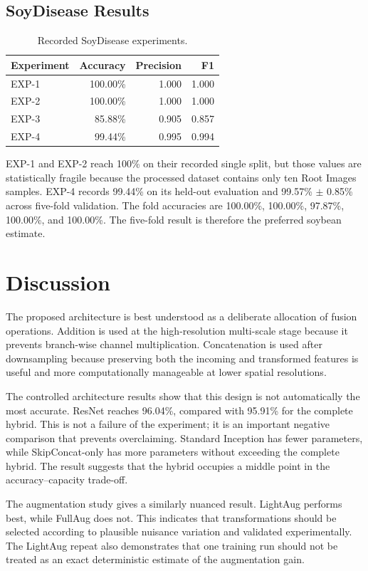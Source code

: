 \documentclass[a4paper,fleqn]{cas-dc}
\begin{document}
\subsection{SoyDisease Results}
\begin{table}[!t]
\centering
\caption{Recorded SoyDisease experiments.}
\label{tab:soy}
\begin{tabular}{lrrr}
\toprule
Experiment & Accuracy & Precision & F1 \\
\midrule
EXP-1 & 100.00\% & 1.000 & 1.000 \\
EXP-2 & 100.00\% & 1.000 & 1.000 \\
EXP-3 & 85.88\% & 0.905 & 0.857 \\
EXP-4 & 99.44\% & 0.995 & 0.994 \\
\bottomrule
\end{tabular}
\end{table}

EXP-1 and EXP-2 reach 100\% on their recorded single split, but those values are statistically fragile because the processed dataset contains only ten Root Images samples. EXP-4 records 99.44\% on its held-out evaluation and 99.57\% $\pm$ 0.85\% across five-fold validation. The fold accuracies are 100.00\%, 100.00\%, 97.87\%, 100.00\%, and 100.00\%. The five-fold result is therefore the preferred soybean estimate.

\section{Discussion}
The proposed architecture is best understood as a deliberate allocation of fusion operations. Addition is used at the high-resolution multi-scale stage because it prevents branch-wise channel multiplication. Concatenation is used after downsampling because preserving both the incoming and transformed features is useful and more computationally manageable at lower spatial resolutions.

The controlled architecture results show that this design is not automatically the most accurate. ResNet reaches 96.04\%, compared with 95.91\% for the complete hybrid. This is not a failure of the experiment; it is an important negative comparison that prevents overclaiming. Standard Inception has fewer parameters, while SkipConcat-only has more parameters without exceeding the complete hybrid. The result suggests that the hybrid occupies a middle point in the accuracy--capacity trade-off.

The augmentation study gives a similarly nuanced result. LightAug performs best, while FullAug does not. This indicates that transformations should be selected according to plausible nuisance variation and validated experimentally. The LightAug repeat also demonstrates that one training run should not be treated as an exact deterministic estimate of the augmentation gain.
\end{document}
